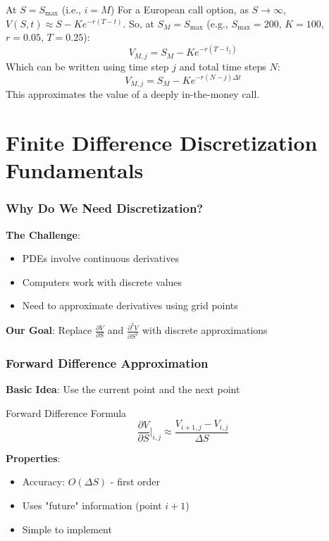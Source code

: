 \documentclass[aspectratio=169]{beamer}
\begin{document}
\begin{frame}
\begin{block}{At $S = S_{\text{max}}$ (i.e., $i=M$)}
For a European call option, as $S \to \infty$, $V(S,t) \approx S - K e^{-r(T-t)}$.
So, at $S_M = S_{\text{max}}$ (e.g., $S_{\text{max}} = 200$, $K=100$, $r=0.05$, $T=0.25$):
\[V_{M,j} = S_M - K e^{-r(T-t_j)}\]
Which can be written using time step $j$ and total time steps $N$:
\[V_{M,j} = S_M - K e^{-r(N-j)\Delta t}\]
This approximates the value of a deeply in-the-money call.
\end{block}
\end{frame}

\section{Finite Difference Discretization Fundamentals}

\begin{frame}
\frametitle{Why Do We Need Discretization?}
\textbf{The Challenge}:
\begin{itemize}
\item PDEs involve continuous derivatives
\item Computers work with discrete values
\item Need to approximate derivatives using grid points
\end{itemize}

\textbf{Our Goal}:
Replace $\frac{\partial V}{\partial S}$ and $\frac{\partial^2 V}{\partial S^2}$ with discrete approximations
\end{frame}

\begin{frame}
\frametitle{Forward Difference Approximation}
\textbf{Basic Idea}: Use the current point and the next point

\begin{block}{Forward Difference Formula}
\[\frac{\partial V}{\partial S} \bigg|_{i,j} \approx \frac{V_{i+1,j} - V_{i,j}}{\Delta S}\]
\end{block}

\textbf{Properties}:
\begin{itemize}
\item Accuracy: $O(\Delta S)$ - first order
\item Uses "future" information (point $i+1$)
\item Simple to implement
\end{itemize}
\end{frame}
\end{document}

